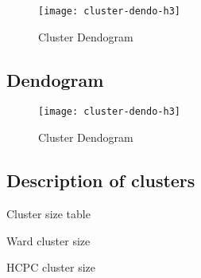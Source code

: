\begin{figure}[H]
    \centering
    \texttt{[image: cluster-dendo-h3]}
    \caption{Cluster Dendogram}%
    \label{fig:dendogram-h3}
\end{figure}

\begin{landscape}

\subsection{Dendogram}%
\label{sub:dendogram}


\begin{figure}[H]
    \centering
    \texttt{[image: cluster-dendo-h3]}
    \caption{Cluster Dendogram}%
    \label{fig:dendogram-final}
\end{figure}

\end{landscape}



\subsection{Description of clusters}%
\label{sub:description_of_clusters}

\begin{table}[h!]
\vspace{5pt}
\caption{Cluster size table}%
\label{tab:cluster_size}
\centering
\begin{subtable}[t]{.3\textwidth}
    \centering
    \caption{Ward cluster size}
    
\end{subtable}
\begin{subtable}[t]{.3\textwidth}
    \centering
    \caption{HCPC cluster size}
    
\end{subtable}
\end{table}


